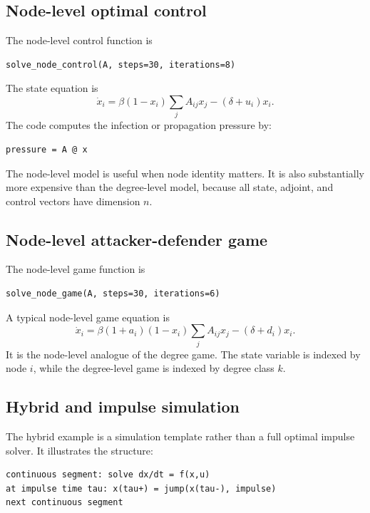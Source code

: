 \documentclass[11pt,a4paper]{article}
\begin{document}
\subsection{Node-level optimal control}

The node-level control function is

\begin{lstlisting}[style=py]
solve_node_control(A, steps=30, iterations=8)
\end{lstlisting}

The state equation is
\[
  \dot{x}_i
  =\beta(1-x_i)\sum_j A_{ij}x_j
  -(\delta+u_i)x_i.
\]
The code computes the infection or propagation pressure by:

\begin{lstlisting}[style=py]
pressure = A @ x
\end{lstlisting}

The node-level model is useful when node identity matters. It is also substantially more expensive than the degree-level model, because all state, adjoint, and control vectors have dimension \(n\).

\subsection{Node-level attacker-defender game}

The node-level game function is

\begin{lstlisting}[style=py]
solve_node_game(A, steps=30, iterations=6)
\end{lstlisting}

A typical node-level game equation is
\[
  \dot{x}_i
  =\beta(1+a_i)(1-x_i)\sum_jA_{ij}x_j
  -(\delta+d_i)x_i.
\]
It is the node-level analogue of the degree game. The state variable is indexed by node \(i\), while the degree-level game is indexed by degree class \(k\).

\subsection{Hybrid and impulse simulation}

The hybrid example is a simulation template rather than a full optimal impulse solver. It illustrates the structure:

\begin{lstlisting}[style=text]
continuous segment: solve dx/dt = f(x,u)
at impulse time tau: x(tau+) = jump(x(tau-), impulse)
next continuous segment
\end{lstlisting}
\end{document}
